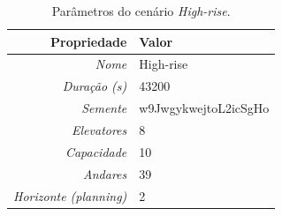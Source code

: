 \lipsum[1]

\begin{table}[htb!]
\centering
\caption{Parâmetros do cenário \textit{High-rise}.}
\label{tab:results:highrise:params}
\begin{tabular}{|r|l|}
\hline
\textbf{Propriedade}          & \textbf{Valor}       \\ \hline
\textit{Nome}                 & High-rise            \\ \hline
\textit{Duração (s)}          & 43200                \\ \hline
\textit{Semente}              & w9JwgykwejtoL2icSgHo \\ \hline
\textit{Elevatores}           & 8                    \\ \hline
\textit{Capacidade}           & 10                   \\ \hline
\textit{Andares}              & 39                   \\ \hline
\textit{Horizonte (planning)} & 2                    \\ \hline
\end{tabular}
\end{table}

